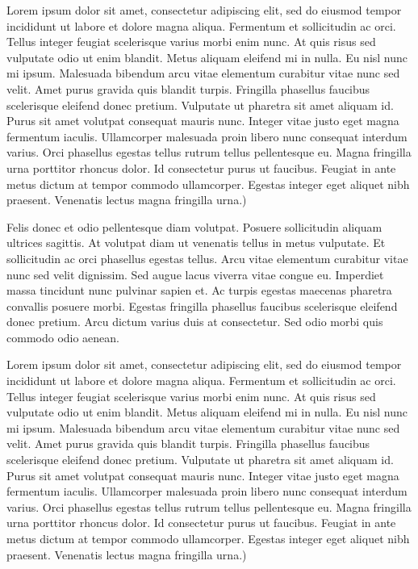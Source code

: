 \documentclass[10pt]{article}
\newenvironment{BoxedInternal}[1][]
{%
  \begin{changemargin}{0cm}{0cm}%
    \begin{mdframed}[roundcorner=5pt,backgroundcolor=swred,outermargin  =-0.5in,innermargin =-0.5in, topline=false, bottomline=false, rightline=false, leftline=false,#1]
    }{%
    \end{mdframed}%
  \end{changemargin}%
}
\newcommand*{\noind}{\setlength{\parindent}{0cm}} %
\newcommand{\bighdr}[2][]{%
  \begin{BoxedInternal}[#1]{}
    \color{white}\huge\bfseries\headingfont\filcenter{#2}
  \end{BoxedInternal}%
}
\begin{document}
\begin{multicols}{2} %

{\noind
Lorem ipsum dolor sit amet, consectetur adipiscing elit, sed do eiusmod tempor incididunt ut labore et dolore magna aliqua. Fermentum et sollicitudin ac orci. Tellus integer feugiat scelerisque varius morbi enim nunc. At quis risus sed vulputate odio ut enim blandit. Metus aliquam eleifend mi in nulla. Eu nisl nunc mi ipsum. Malesuada bibendum arcu vitae elementum curabitur vitae nunc sed velit. Amet purus gravida quis blandit turpis. Fringilla phasellus faucibus scelerisque eleifend donec pretium. Vulputate ut pharetra sit amet aliquam id. Purus sit amet volutpat consequat mauris nunc. Integer vitae justo eget magna fermentum iaculis. Ullamcorper malesuada proin libero nunc consequat interdum varius. Orci phasellus egestas tellus rutrum tellus pellentesque eu. Magna fringilla urna porttitor rhoncus dolor. Id consectetur purus ut faucibus. Feugiat in ante metus dictum at tempor commodo ullamcorper. Egestas integer eget aliquet nibh praesent. Venenatis lectus magna fringilla urna.)
}

\bighdr{INTRODUCTION}
{\noind
Felis donec et odio pellentesque diam volutpat. Posuere sollicitudin aliquam ultrices sagittis. At volutpat diam ut venenatis tellus in metus vulputate. Et sollicitudin ac orci phasellus egestas tellus. Arcu vitae elementum curabitur vitae nunc sed velit dignissim. Sed augue lacus viverra vitae congue eu. Imperdiet massa tincidunt nunc pulvinar sapien et. Ac turpis egestas maecenas pharetra convallis posuere morbi. Egestas fringilla phasellus faucibus scelerisque eleifend donec pretium. Arcu dictum varius duis at consectetur. Sed odio morbi quis commodo odio aenean.
}

Lorem ipsum dolor sit amet, consectetur adipiscing elit, sed do eiusmod tempor incididunt ut labore et dolore magna aliqua. Fermentum et sollicitudin ac orci. Tellus integer feugiat scelerisque varius morbi enim nunc. At quis risus sed vulputate odio ut enim blandit. Metus aliquam eleifend mi in nulla. Eu nisl nunc mi ipsum. Malesuada bibendum arcu vitae elementum curabitur vitae nunc sed velit. Amet purus gravida quis blandit turpis. Fringilla phasellus faucibus scelerisque eleifend donec pretium. Vulputate ut pharetra sit amet aliquam id. Purus sit amet volutpat consequat mauris nunc. Integer vitae justo eget magna fermentum iaculis. Ullamcorper malesuada proin libero nunc consequat interdum varius. Orci phasellus egestas tellus rutrum tellus pellentesque eu. Magna fringilla urna porttitor rhoncus dolor. Id consectetur purus ut faucibus. Feugiat in ante metus dictum at tempor commodo ullamcorper. Egestas integer eget aliquet nibh praesent. Venenatis lectus magna fringilla urna.)\\


\end{multicols}
\end{document}
